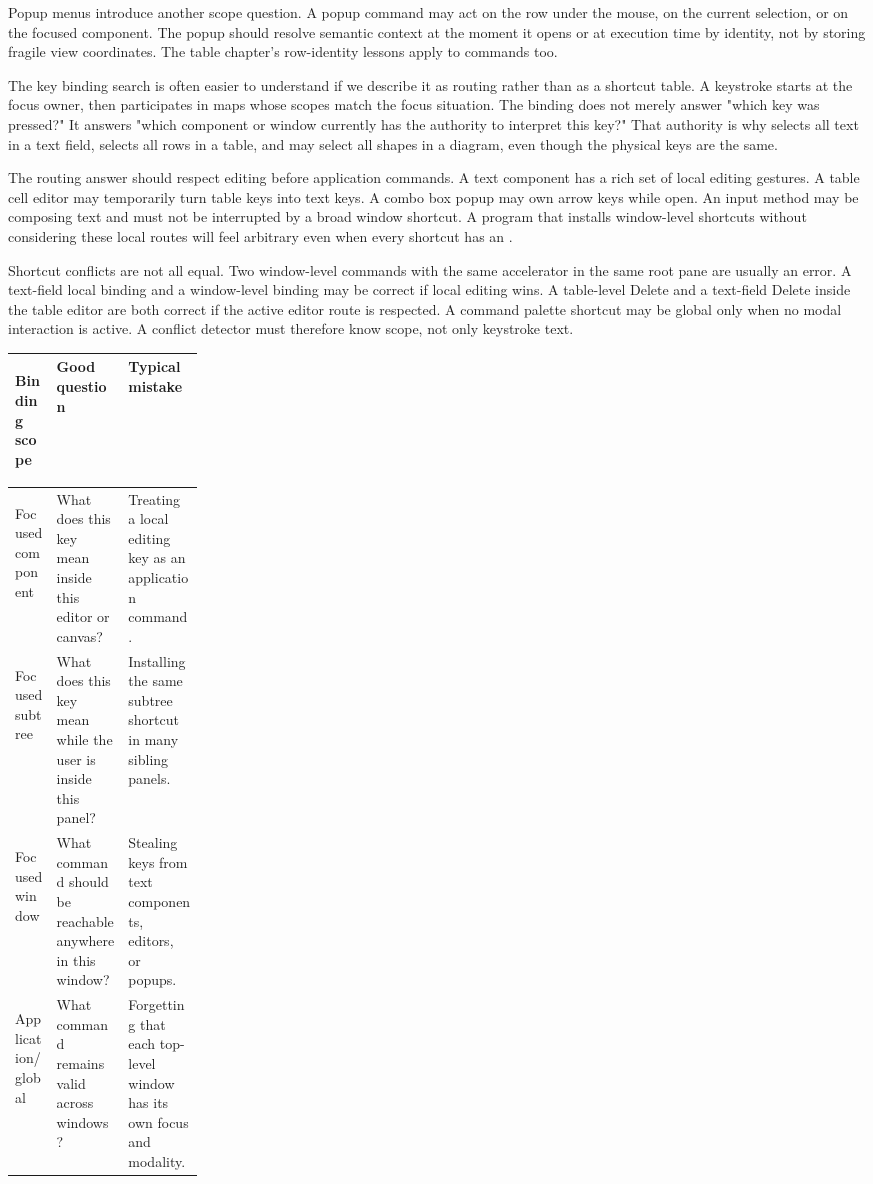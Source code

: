 Popup menus introduce another scope question. A popup command may act on the row under the mouse, on the current selection, or on the focused component. The popup should resolve semantic context at the moment it opens or at execution time by identity, not by storing fragile view coordinates. The table chapter's row-identity lessons apply to commands too.

The key binding search is often easier to understand if we describe it as
routing rather than as a shortcut table. A keystroke starts at the focus owner,
then participates in maps whose scopes match the focus situation. The binding
does not merely answer "which key was pressed?" It answers "which component or
window currently has the authority to interpret this key?" That authority is
why  selects all text in a text field, selects all rows in a table,
and may select all shapes in a diagram, even though the physical keys are the
same.

The routing answer should respect editing before application commands. A text
component has a rich set of local editing gestures. A table cell editor may
temporarily turn table keys into text keys. A combo box popup may own arrow keys
while open. An input method may be composing text and must not be interrupted by
a broad window shortcut. A program that installs window-level shortcuts without
considering these local routes will feel arbitrary even when every shortcut has
an .

Shortcut conflicts are not all equal. Two window-level commands with the same
accelerator in the same root pane are usually an error. A text-field local
binding and a window-level binding may be correct if local editing wins. A
table-level Delete and a text-field Delete inside the table editor are both
correct if the active editor route is respected. A command palette shortcut may
be global only when no modal interaction is active. A conflict detector must
therefore know scope, not only keystroke text.

\begin{center}\small
\begin{tabularx}{0.96\linewidth}{>{\bfseries\raggedright\arraybackslash}p{0.22\linewidth}X X}
\toprule
Binding scope & Good question & Typical mistake\\
\midrule
Focused component & What does this key mean inside this editor or canvas? & Treating a local editing key as an application command.\\
Focused subtree & What does this key mean while the user is inside this panel? & Installing the same subtree shortcut in many sibling panels.\\
Focused window & What command should be reachable anywhere in this window? & Stealing keys from text components, editors, or popups.\\
Application/\allowbreak global & What command remains valid across windows? & Forgetting that each top-level window has its own focus and modality.\\
\bottomrule
\end{tabularx}
\end{center}

